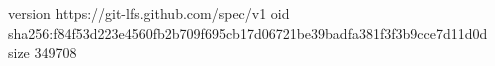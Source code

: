 version https://git-lfs.github.com/spec/v1
oid sha256:f84f53d223e4560fb2b709f695cb17d06721be39badfa381f3f3b9cce7d11d0d
size 349708
